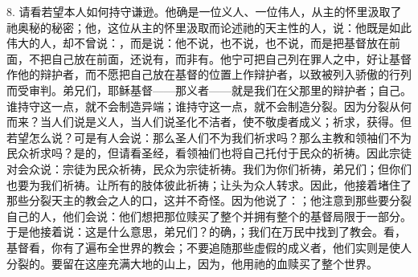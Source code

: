 8. 请看若望本人如何持守谦逊。他确是一位义人、一位伟人，从主的怀里汲取了祂奥秘的秘密；他，这位从主的怀里汲取而论述祂的天主性的人，说：他既是如此伟大的人，却不曾说：，而是说：他不说，也不说，也不说，而是把基督放在前面，不把自己放在前面，还说有，而非有。他宁可把自己列在罪人之中，好让基督作他的辩护者，而不愿把自己放在基督的位置上作辩护者，以致被列入骄傲的行列而受审判。弟兄们，耶稣基督——那义者——就是我们在父那里的辩护者；自己。谁持守这一点，就不会制造异端；谁持守这一点，就不会制造分裂。因为分裂从何而来？当人们说是义人，当人们说圣化不洁者，使不敬虔者成义；祈求，获得。但若望怎么说？可是有人会说：那么圣人们不为我们祈求吗？那么主教和领袖们不为民众祈求吗？是的，但请看圣经，看领袖们也将自己托付于民众的祈祷。因此宗徒对会众说：宗徒为民众祈祷，民众为宗徒祈祷。我们为你们祈祷，弟兄们；但你们也要为我们祈祷。让所有的肢体彼此祈祷；让头为众人转求。因此，他接着堵住了那些分裂天主的教会之人的口，这并不奇怪。因为他说了：；他注意到那些要分裂自己的人，他们会说：他们想把那位赎买了整个并拥有整个的基督局限于一部分。于是他接着说：这是什么意思，弟兄们？的确，；我们在万民中找到了教会。看，基督看，你有了遍布全世界的教会；不要追随那些虚假的成义者，他们实则是使人分裂的。要留在这座充满大地的山上，因为，他用祂的血赎买了整个世界。\par

